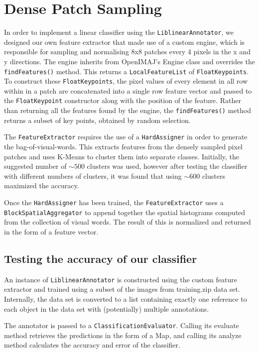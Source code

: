 \documentclass[a4paper]{article}
\begin{document}
\section{Dense Patch Sampling}
In order to implement a linear classifier using the \texttt{LiblinearAnnotator}, we designed our own feature extractor that made use of a custom engine, which is responsible for sampling and normalising 8x8 patches every 4 pixels in the x and y directions. The engine inherits from OpenIMAJ’s Engine class and overrides the \texttt{findFeatures()} method. This returns a \texttt{LocalFeatureList} of \texttt{FloatKeypoints}. To construct these \texttt{FloatKeypoints}, the pixel values of every element in all row within in a patch are concatenated into a single row feature vector and passed to the \texttt{FloatKeypoint} constructor along with the position of the feature. Rather than returning all the features found by the engine, the \texttt{findFeatures()} method returns a subset of key points, obtained by random selection.

The \texttt{FeatureExtractor} requires the use of a \texttt{HardAssigner} in order to generate the bag-of-visual-words. This extracts features from the densely sampled pixel patches and uses K-Means to cluster them into separate classes. Initially, the suggested number of $\sim500$ clusters was used, however after testing the classifier with different numbers of clusters, it was found that using $\sim600$ clusters maximized the accuracy.

Once the \texttt{HardAssigner} has been trained, the \texttt{FeatureExtractor} uses a  \texttt{BlockSpatialAggregator} to append together the spatial histograms computed from the collection of visual words. The result of this is normalized and returned in the form of a feature vector.

\subsection{Testing the accuracy of our classifier}
An instance of \texttt{LiblinearAnnotator} is constructed using the custom feature extractor and trained using a subset of the images from training.zip data set. Internally, the data set is converted to a list containing exactly one reference to each object in the data set with (potentially) multiple annotations. 

The annotator is passed to a \texttt{ClassificationEvaluator}. Calling its evaluate method retrieves the predictions in the form of a Map, and calling its analyze method calculates the accuracy and error of the classifier.
\end{document}
